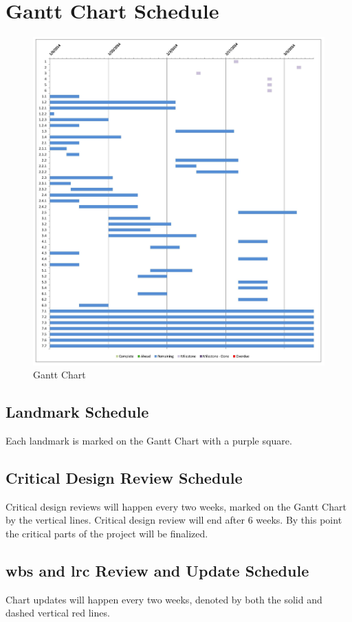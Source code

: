 \section{Gantt Chart Schedule}
\begin{figure}[H]
\centering
\includegraphics[width=1\textwidth]{gantt.jpg}
\caption{Gantt Chart}
\label{fig:Gantt Chart}
\end{figure}
\subsection{Landmark Schedule}
Each landmark is marked on the Gantt Chart with a purple square.
\subsection{Critical Design Review Schedule}
Critical design reviews will happen every two weeks, marked on the Gantt Chart by the vertical lines.
Critical design review will end after 6 weeks. By this point the critical parts of the project will be finalized. 
\subsection{\gls{wbs} and \gls{lrc} Review and Update Schedule}
Chart updates will happen every two weeks, denoted by both the solid and dashed vertical red lines.
